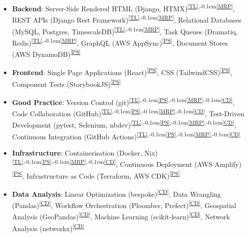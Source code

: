 \documentclass[a4paper,11pt]{article}
\newcommand{\skillref}[1]{\textsuperscript{\ref{#1}}}
\newcommand{\ssep}{\textsuperscript{,\kern-0.1em}}
\begin{document}
\begin{minipage}[t]{0.97\textwidth}
  \begin{itemize}[nosep, leftmargin=2em, itemsep=4pt]

      \item \textbf{Backend}:
      Server-Side Rendered HTML (Django, HTMX)\skillref{TL}\ssep\skillref{MRP},
      REST APIs (Django Rest Framework)\skillref{TL}\ssep\skillref{MRP},
      Relational Databases (MySQL, Postgres, TimescaleDB)\skillref{TL}\ssep\skillref{MRP},
      Task Queues (Dramatiq, Redis)\skillref{TL}\ssep\skillref{MRP},
      GraphQL (AWS AppSync)\skillref{PS},
      Document Stores (AWS DynamoDB)\skillref{PS}

      \item \textbf{Frontend}:
      Single Page Applications (React)\skillref{PS},
      CSS (TailwindCSS)\skillref{PS},
      Component Tests (StorybookJS)\skillref{PS}

      \item \textbf{Good Practice}:
      Version Control (git)\skillref{TL}\ssep\skillref{PS}\ssep\skillref{MRP}\ssep\skillref{CD},
      Code Collaboration (GitHub)\skillref{TL}\ssep\skillref{PS}\ssep\skillref{MRP}\ssep\skillref{CD},
      Test-Driven Development (pytest, Selenium, nbdev)\skillref{TL}\ssep\skillref{PS}\ssep\skillref{MRP}\ssep\skillref{CD},
      Continuous Integration (GitHub Actions)\skillref{TL}\ssep\skillref{PS}\ssep\skillref{MRP}\ssep\skillref{CD}

      \item \textbf{Infrastructure}:
      Containerisation (Docker, Nix)\skillref{TL}\ssep\skillref{PS}\ssep\skillref{MRP}\ssep\skillref{CD},
      Continuous Deployment (AWS Amplify)\skillref{PS},
      Infrastructure as Code (Terraform, AWS CDK)\skillref{PS}

      \item \textbf{Data Analysis}:
      Linear Optimization (bespoke)\skillref{CD},
      Data Wrangling (Pandas)\skillref{CD},
      Workflow Orchestration (Ploomber, Prefect)\skillref{CD},
      Geospatial Analysis (GeoPandas)\skillref{CD},
      Machine Learning (scikit-learn)\skillref{CD},
      Network Analysis (networkx)\skillref{CD}

  \end{itemize}
\end{minipage}

\end{document}
